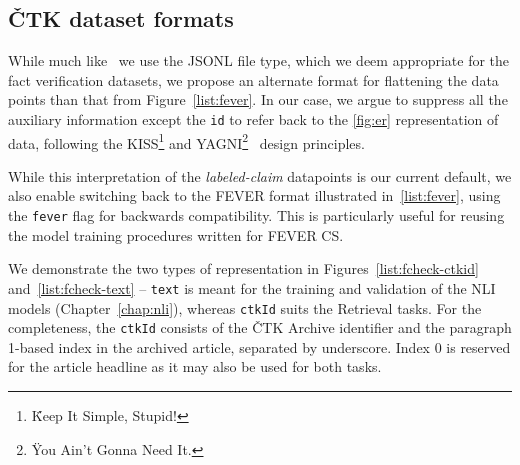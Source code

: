 \subsection{ČTK dataset formats}
While much like~\cite{fever} we use the \textsf{JSONL} file type, which we deem appropriate for the fact verification datasets, we propose an alternate format for flattening the data points than that from Figure~\ref{list:fever}. In our case, we argue to suppress all the auxiliary information except the  \texttt{id} to refer back to the \ref{fig:er} representation of data, following the KISS\footnote{\"{Keep It Simple, Stupid!}} and YAGNI\footnote{\"{You Ain't Gonna Need It.}}~\cite{jeffries2001extreme} design principles.

While this interpretation of the \textit{labeled-claim} datapoints is our current default, we also enable switching back to the \textsf{FEVER} format illustrated in~\ref{list:fever}, using the \texttt{fever} flag for backwards compatibility. This is particularly useful for reusing the model training procedures written for \textsf{FEVER CS}. 

We demonstrate the two types of  representation in Figures~\ref{list:fcheck-ctkid} and~\ref{list:fcheck-text} -- \texttt{text}  is meant for the training and validation of the NLI models (Chapter~\ref{chap:nli}), whereas \texttt{ctkId} suits the Retrieval tasks. For the completeness, the \texttt{ctkId} consists of the \textsf{ČTK Archive} identifier and the paragraph 1-based index in the archived article, separated by underscore. Index 0 is reserved for the article headline as it may also be used for both tasks.

